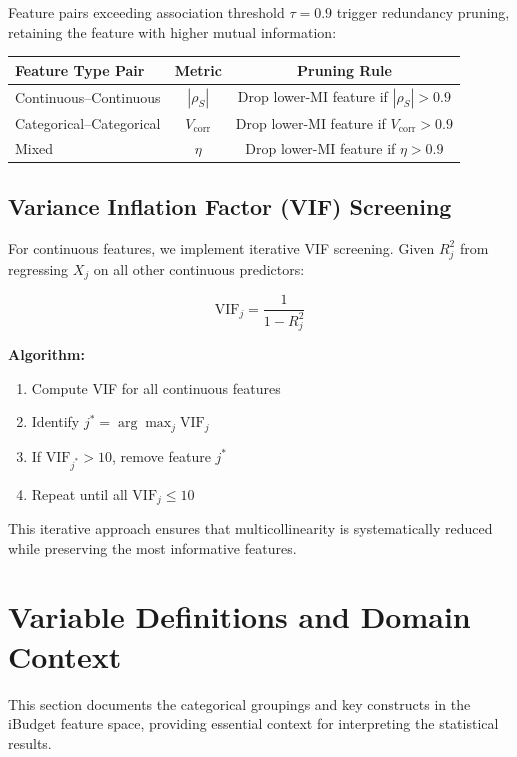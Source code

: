 Feature pairs exceeding association threshold $\tau = 0.9$ trigger redundancy pruning, retaining the feature with higher mutual information:

\begin{center}
\begin{tabular}{|l|c|c|}
\hline
\textbf{Feature Type Pair} & \textbf{Metric} & \textbf{Pruning Rule} \\
\hline
Continuous--Continuous & $|\rho_S|$ & Drop lower-MI feature if $|\rho_S| > 0.9$ \\
\hline
Categorical--Categorical & $V_{\text{corr}}$ & Drop lower-MI feature if $V_{\text{corr}} > 0.9$ \\
\hline
Mixed & $\eta$ & Drop lower-MI feature if $\eta > 0.9$ \\
\hline
\end{tabular}
\end{center}

\subsection{Variance Inflation Factor (VIF) Screening}

For continuous features, we implement iterative VIF screening. Given $R^2_j$ from regressing $X_j$ on all other continuous predictors:

\begin{equation}
\text{VIF}_j = \frac{1}{1 - R^2_j}
\label{eq:vif}
\end{equation}

\textbf{Algorithm:}
\begin{enumerate}
    \item Compute VIF for all continuous features
    \item Identify $j^* = \arg\max_j \text{VIF}_j$
    \item If $\text{VIF}_{j^*} > 10$, remove feature $j^*$
    \item Repeat until all $\text{VIF}_j \leq 10$
\end{enumerate}

This iterative approach ensures that multicollinearity is systematically reduced while preserving the most informative features.

\section{Variable Definitions and Domain Context}

This section documents the categorical groupings and key constructs in the iBudget feature space, providing essential context for interpreting the statistical results.

